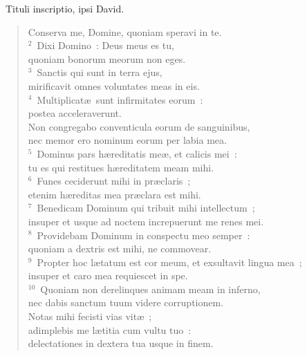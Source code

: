 ~\lettrine[lines=10,image=true,loversize=0.05,lraise=-0.03]{T}{}ituli inscriptio, ipsi David. \begin{flushleft}\begin{verse}\vspace{6pt}Conserva me, Domine, quoniam speravi in te.\\
${}^{2}$~Dixi Domino~: Deus meus es tu,\\ quoniam bonorum meorum non eges.\\
${}^{3}$~Sanctis qui sunt in terra ejus,\\ mirificavit omnes voluntates meas in eis.\\
${}^{4}$~Multiplicat\ae\ sunt infirmitates eorum~:\\ postea acceleraverunt.\\ Non congregabo conventicula eorum de sanguinibus,\\ nec memor ero nominum eorum per labia mea.\\
${}^{5}$~Dominus pars h\ae reditatis me\ae , et calicis mei~:\\ tu es qui restitues h\ae reditatem meam mihi.\\
${}^{6}$~Funes ceciderunt mihi in pr\ae claris~;\\ etenim h\ae reditas mea pr\ae clara est mihi.\\
${}^{7}$~Benedicam Dominum qui tribuit mihi intellectum~;\\ insuper et usque ad noctem increpuerunt me renes mei.\\
${}^{8}$~Providebam Dominum in conspectu meo semper~:\\ quoniam a dextris est mihi, ne commovear.\\
${}^{9}$~Propter hoc l\ae tatum est cor meum, et exsultavit lingua mea~;\\ insuper et caro mea requiescet in spe.\\
${}^{10}$~Quoniam non derelinques animam meam in inferno,\\ nec dabis sanctum tuum videre corruptionem.\\ Notas mihi fecisti vias vit\ae~;\\ adimplebis me l\ae titia cum vultu tuo~:\\ delectationes in dextera tua usque in finem.\end{verse}\end{flushleft}


